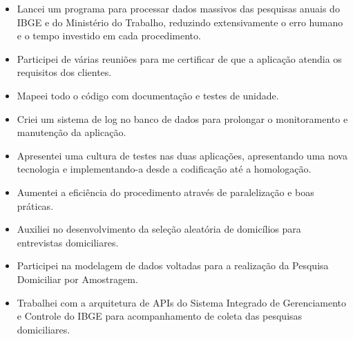 \documentclass[10pt,a4paper]{altacv}
\begin{document}
\begin{comment}
\cvevent{Pesquisa de Estoques}{IBGE}{Outubro 2017 -- Dezembro 2017}{}

\begin{itemize}
    \item{Aumentei a eficiência da comunicação com empresas e contadores participantes do censo ao desenvolver um sistema de notificação automática.}
\end{itemize}


\divider
\end{comment}


\begin{itemize}
    \item{Lancei um programa para processar dados massivos das pesquisas anuais do IBGE e do Ministério do Trabalho, reduzindo extensivamente o erro humano e o tempo investido em cada procedimento.}
    \item{Participei de várias reuniões para me certificar de que a aplicação atendia os requisitos dos clientes.}
    \item{Mapeei todo o código com documentação e testes de unidade.}
    \item{Criei um sistema de log no banco de dados para prolongar o monitoramento e manutenção da aplicação.}
\end{itemize}

\divider


\begin{itemize}
    \item{Apresentei uma cultura de testes nas duas aplicações, apresentando uma nova tecnologia e implementando-a desde a codificação até a homologação.}
    \item{Aumentei a eficiência do procedimento através de paralelização e boas práticas.}
    \item{Auxiliei no desenvolvimento da seleção aleatória de domicílios para entrevistas domiciliares.}
    \item{Participei na modelagem de dados voltadas para a realização da Pesquisa Domiciliar por Amostragem.}
    \item{Trabalhei com a arquitetura de APIs do Sistema Integrado de Gerenciamento e Controle do IBGE para acompanhamento de coleta das pesquisas domiciliares.}
\end{itemize}
\end{document}
